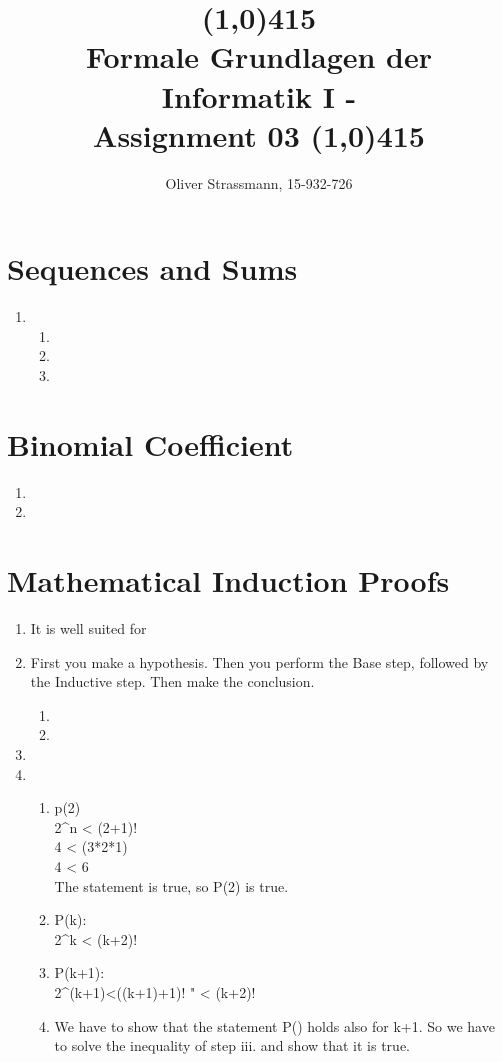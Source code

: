 \documentclass{article}
\title{ \line(1,0){415} \\ Formale Grundlagen der Informatik I -\\ Assignment 03
\line(1,0){415}}
\author{Oliver Strassmann, 15-932-726}
\begin{document}
\maketitle

\section{Sequences and Sums}
\begin{enumerate}[label=\alph*)]
	\item 
			\begin{enumerate}[label=\roman*.]
				\item 
				\item
				\item
			\end{enumerate}

\end{enumerate}

\section{Binomial Coefficient}
\begin{enumerate}[label=\alph*)]
	\item 
	\item
\end{enumerate}

\section{Mathematical Induction Proofs}
\begin{enumerate}[label=\alph*)]
	\item It is well suited for 
	\item First you make a hypothesis. Then you perform the Base step, followed by the Inductive step. Then make the conclusion. 
	\begin{enumerate}[label=\roman*.]
		\item
		\item
	\end{enumerate}
	\item
	\item
	\begin{enumerate}[label=\roman*.]
		\item p(2)\\2^n < (2+1)! \\
			4 < (3*2*1) \\
			4 < 6 \\
			The statement is true, so P(2) is true.
		\item P(k):\\ 2^k < (k+2)!
		\item P(k+1):\\
			2^(k+1)<((k+1)+1)!
			" < (k+2)!
		\item We have to show that the statement P() holds also for k+1. So we have to solve the inequality of step iii. and show that it is true.
	\end{enumerate}
\end{enumerate}
\end{document}
